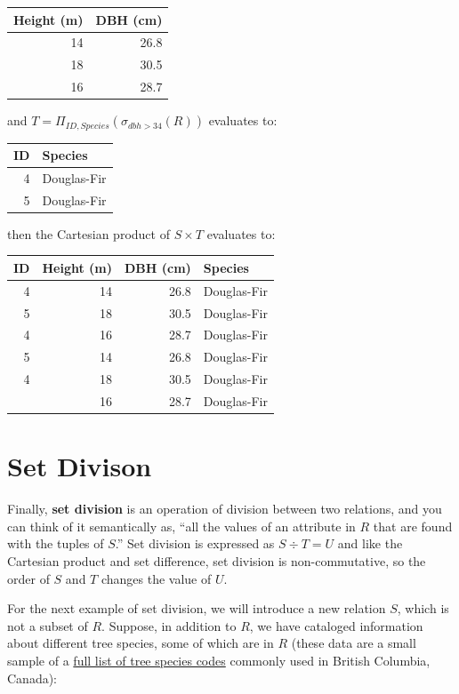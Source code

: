 \documentclass[
]{book}
\begin{document}
\begin{tabular}{rr}
\toprule
Height (m) & DBH (cm)\\
\midrule
14 & 26.8\\
18 & 30.5\\
16 & 28.7\\
\bottomrule
\end{tabular}

and \(T = Π_{ID,Species}(σ_{dbh>34}(R))\) evaluates to:

\begin{tabular}{rl}
\toprule
ID & Species\\
\midrule
4 & Douglas-Fir\\
5 & Douglas-Fir\\
\bottomrule
\end{tabular}

then the Cartesian product of \(S×T\) evaluates to:

\begin{tabular}{rrrl}
\toprule
ID & Height (m) & DBH (cm) & Species\\
\midrule
4 & 14 & 26.8 & Douglas-Fir\\
5 & 18 & 30.5 & Douglas-Fir\\
4 & 16 & 28.7 & Douglas-Fir\\
5 & 14 & 26.8 & Douglas-Fir\\
4 & 18 & 30.5 & Douglas-Fir\\
\addlinespace
5 & 16 & 28.7 & Douglas-Fir\\
\bottomrule
\end{tabular}

\hypertarget{set-divison}{%
\section{Set Divison}\label{set-divison}}

Finally, \textbf{set division} is an operation of division between two relations, and you can think of it semantically as, ``all the values of an attribute in \(R\) that are found with the tuples of \(S\).'' Set division is expressed as \(S÷T=U\) and like the Cartesian product and set difference, set division is non-commutative, so the order of \(S\) and \(T\) changes the value of \(U\).

For the next example of set division, we will introduce a new relation \(S\), which is not a subset of \(R\). Suppose, in addition to \(R\), we have cataloged information about different tree species, some of which are in \(R\) (these data are a small sample of a \href{https://www.for.gov.bc.ca/hfp/publications/00026/fs708-14-appendix_d.htm\#ad_02}{full list of tree species codes} commonly used in British Columbia, Canada):
\end{document}
